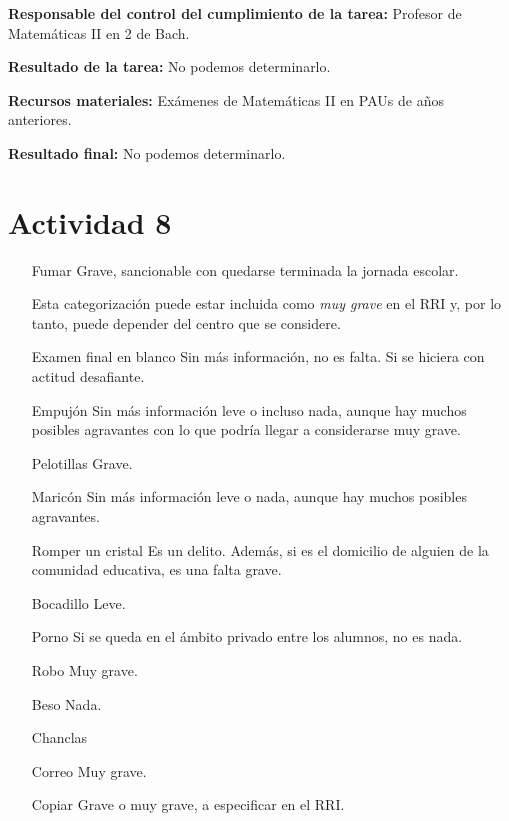 \textbf{Responsable del control del cumplimiento de la tarea:}
Profesor de Matemáticas II en 2 de Bach.


\textbf{Resultado de la tarea:}
No podemos determinarlo.


\textbf{Recursos materiales:}
Exámenes de Matemáticas II en PAUs de años anteriores.


\textbf{Resultado final:}
No podemos determinarlo.



\section{Actividad 8}

\begin{enumerate}
	\item[Fumar] Grave, sancionable con quedarse terminada la jornada escolar.

	\subitem Esta categorización puede estar incluida como \textit{muy grave} en el RRI y, por lo tanto, puede depender del centro que se considere.

	\item[Examen final en blanco] Sin más información, no es falta.
 Si se hiciera con actitud desafiante.

	\item[Empujón] Sin más información leve o incluso nada, aunque hay muchos posibles agravantes con lo que podría llegar a considerarse muy grave.

	\item[Pelotillas] Grave.

	\item[Maricón] Sin más información leve o nada, aunque hay muchos posibles agravantes.

	\item[Romper un cristal] Es un delito.
 Además, si es el domicilio de alguien de la comunidad educativa, es una falta grave.
 
	\item[Bocadillo] Leve.

	\item[Porno] Si se queda en el ámbito privado entre los alumnos, no es nada.

	\item[Robo] Muy grave.

	\item[Beso] Nada.

	\item[Chanclas] 
	\item[Correo] Muy grave.

	\item[Copiar] Grave o muy grave, a especificar en el RRI.

\end{enumerate}


